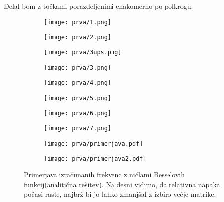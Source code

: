 \documentclass{article}
\begin{document}
Delal bom z točkami porazdeljenimi enakomerno po polkrogu:

\begin{figure}[H]
\centering
\begin{subfigure}{.49\textwidth}
\texttt{[image: prva/1.png]}
\end{subfigure}
\begin{subfigure}{.49\textwidth}
\texttt{[image: prva/2.png]}
\end{subfigure}
\caption*{}
\end{figure}


\begin{figure}[H]
\centering
\begin{subfigure}{.49\textwidth}
\texttt{[image: prva/3ups.png]}
\end{subfigure}
\begin{subfigure}{.49\textwidth}
\texttt{[image: prva/3.png]}
\end{subfigure}
\caption*{}
\end{figure}

\begin{figure}[H]
\centering
\begin{subfigure}{.49\textwidth}
\texttt{[image: prva/4.png]}
\end{subfigure}
\begin{subfigure}{.49\textwidth}
\texttt{[image: prva/5.png]}
\end{subfigure}
\caption*{}
\end{figure}

\begin{figure}[H]
\centering
\begin{subfigure}{.49\textwidth}
\texttt{[image: prva/6.png]}
\end{subfigure}
\begin{subfigure}{.49\textwidth}
\texttt{[image: prva/7.png]}
\end{subfigure}
\caption*{}
\end{figure}

\begin{figure}[H]
\centering
\begin{subfigure}{.49\textwidth}
\texttt{[image: prva/primerjava.pdf]}
\end{subfigure}
\begin{subfigure}{.49\textwidth}
\texttt{[image: prva/primerjava2.pdf]}
\end{subfigure}
\caption*{Primerjava izračunanih frekvenc z ničlami Besselovih funkcij(analitična rešitev). Na desni vidimo, da relativna napaka počasi raste, najbrž bi jo lahko zmanjšal z izbiro večje matrike.}
\end{figure}
\end{document}
